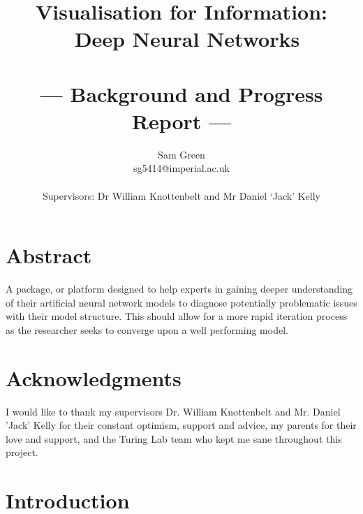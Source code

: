 \documentclass[a4paper,11pt,titlepage]{article}
\title{Visualisation for Information: \\\ Deep Neural Networks \\\ \\\Large{--- Background and Progress Report ---}}
\author{Sam Green\\
       \small{sg5414@imperial.ac.uk}\\ \\
       \small{Supervisors: Dr William Knottenbelt and Mr Daniel `Jack' Kelly}
}
\begin{document}
\maketitle

\clearpage
\clearpage

\section*{Abstract}
A package, or platform designed to help experts in gaining deeper understanding of their artificial neural network models to diagnose potentially problematic issues with their model structure. This should allow for a more rapid iteration process as the researcher seeks to converge upon a well performing model.
\clearpage

\section*{Acknowledgments}
I would like to thank my supervisors Dr. William Knottenbelt and Mr. Daniel 'Jack' Kelly for their constant optimism, support and advice, my parents for their love and support, and the Turing Lab team who kept me sane throughout this project.

\clearpage

\tableofcontents
\clearpage

\section{Introduction}
\end{document}

